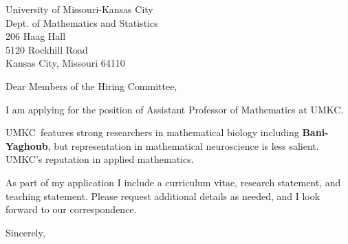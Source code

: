 \documentclass[11pt,a4paper]{letter}
\begin{document}
\def\School{UMKC}
\begin{letter}
{University of Missouri-Kansas City\\
Dept. of Mathematics and Statistics\\
206 Haag Hall\\
5120 Rockhill Road\\
Kansas City, Missouri 64110}


\opening{Dear Members of the Hiring Committee,}

I am applying for the position of Assistant Professor of Mathematics at \School. 



\School~features strong researchers in mathematical biology including \textbf{Bani-Yaghoub}, but representation in mathematical neuroscience is less salient. \School's reputation in applied mathematics.



As part of my application I include a curriculum vitae, research statement, and teaching statement. Please request additional details as needed, and I look forward to our correspondence.

\closing{Sincerely,}
\end{letter}
\end{document}
